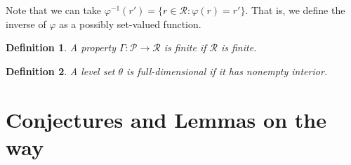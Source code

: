 \documentclass[12pt]{article}
\renewcommand{\P}{\mathcal{P}}
\newcommand{\R}{\mathcal{R}}
\newcommand{\im}{\text{im}}
\newtheorem{definition}{Definition}
\begin{document}
Note that we can take $\varphi^{-1}(r') = \{ r \in \R: \varphi(r) = r' \}$.
That is, we define the inverse of $\varphi$ as a possibly set-valued function.

\begin{definition}
A property $\Gamma: \P \to \R$ is \emph{finite} if $\R$ is finite. %
\end{definition}


\begin{definition}
	A level set $\theta$ is \emph{full-dimensional} if it has nonempty interior.
\end{definition}



\section{Conjectures and Lemmas on the way}
\end{document}
